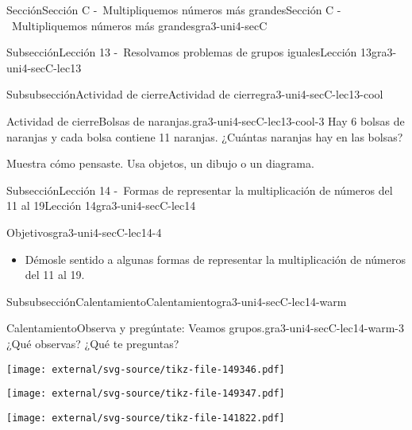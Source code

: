 \documentclass[twoside,14pt,]{extarticle}
\begin{document}
\begin{sectionptx}{Sección}{Sección C -~Multipliquemos números más grandes}{}{Sección C -~Multipliquemos números más grandes}{}{}{gra3-uni4-secC}
\begin{subsectionptx}{Subsección}{Lección 13 -~Resolvamos problemas de grupos iguales}{}{Lección 13}{}{}{gra3-uni4-secC-lec13}
\begin{subsubsectionptx}{Subsubsección}{Actividad de cierre}{}{Actividad de cierre}{}{}{gra3-uni4-secC-lec13-cool}
\begin{project}{Actividad de cierre}{Bolsas de naranjas.}{gra3-uni4-secC-lec13-cool-3}
Hay 6 bolsas de naranjas y cada bolsa contiene 11 naranjas. ¿Cuántas naranjas hay en las bolsas?%
\par
Muestra cómo pensaste. Usa objetos, un dibujo o un diagrama.%
\end{project}%
\end{subsubsectionptx}
\end{subsectionptx}
%
%
\typeout{************************************************}
\typeout{************************************************}
%
\begin{subsectionptx}{Subsección}{Lección 14 -~Formas de representar la multiplicación de números del 11 al 19}{}{Lección 14}{}{}{gra3-uni4-secC-lec14}
\begin{objectives}{Objetivos}{gra3-uni4-secC-lec14-4}
%
\begin{itemize}[label=\textbullet]
\item{}Démosle sentido a algunas formas de representar la multiplicación de números del 11 al 19.%
\end{itemize}
\end{objectives}
%
%
\typeout{************************************************}
\typeout{************************************************}
%
\begin{subsubsectionptx}{Subsubsección}{Calentamiento}{}{Calentamiento}{}{}{gra3-uni4-secC-lec14-warm}
\begin{exploration}{Calentamiento}{Observa y pregúntate: Veamos grupos.}{gra3-uni4-secC-lec14-warm-3}%
¿Qué observas? ¿Qué te preguntas?%
\begin{sidebyside}{3}{0}{0}{0}%
\begin{sbspanel}{0.333333333333333}%
\texttt{[image: external/svg-source/tikz-file-149346.pdf]}
\end{sbspanel}%
\begin{sbspanel}{0.333333333333333}%
\texttt{[image: external/svg-source/tikz-file-149347.pdf]}
\end{sbspanel}%
\begin{sbspanel}{0.333333333333333}%
\texttt{[image: external/svg-source/tikz-file-141822.pdf]}
\end{sbspanel}%
\end{sidebyside}%
\end{exploration}%
\end{subsubsectionptx}

\end{subsectionptx}
\end{sectionptx}
\end{document}
